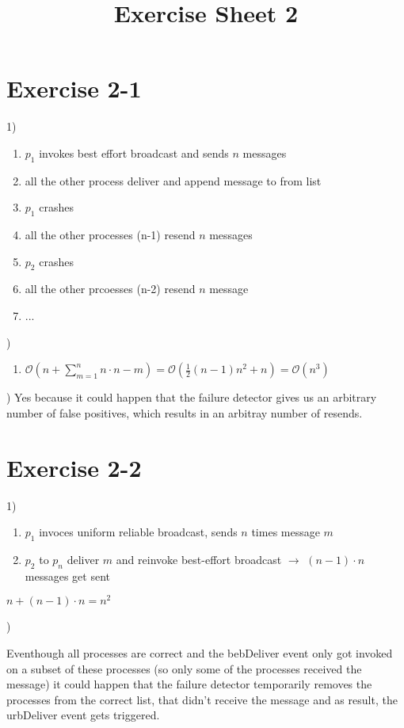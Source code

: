 \documentclass[a4paper]{article}
\title{Exercise Sheet 2}
\begin{document}
\maketitle

\section{Exercise 2-1}
1)
\begin{enumerate}
    \item
        $p_1$ invokes best effort broadcast and sends $n$ messages
    \item
        all the other process deliver and append message to from list
    \item
        $p_1$ crashes
    \item
        all the other processes (n-1) resend $n$ messages
    \item
        $p_2$ crashes
    \item
        all the other prcoesses (n-2) resend $n$ message
    \item
        ...
\end{enumerate}

)
\begin{enumerate}
    \item
        $\mathcal{O}(n + \sum_{m=1}^{n} n \cdot n-m) = \mathcal{O}(\frac{1}{2}(n-1)n^2+n) = \mathcal{O}(n^3)$
\end{enumerate}

)
Yes because it could happen that the failure detector gives us an arbitrary number of false positives, which results in an arbitray number of resends.

\section{Exercise 2-2}
1)
\begin{enumerate}
    \item
        $p_1$ invoces uniform reliable broadcast, sends $n$ times message $m$
    \item
        $p_2$ to $p_n$ deliver $m$ and reinvoke best-effort broadcast $\rightarrow$ $(n-1) \cdot n$ messages get sent
\end{enumerate}
$n + (n-1) \cdot n = n^2$

)

Eventhough all processes are correct and the bebDeliver event only got invoked on a subset of these processes (so only some of the processes received the message) it could happen that the failure detector temporarily removes the processes from the correct list, that didn't receive the message and as result, the urbDeliver event gets triggered.
\end{document}
